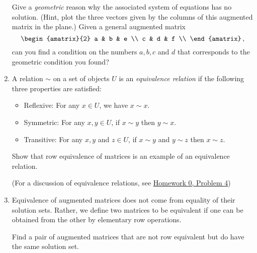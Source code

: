 \begin{enumerate}
Give a \emph{geometric} reason why the associated system of equations has no solution. (Hint, plot the three vectors
given by the columns of this augmented matrix in the plane.) Given a general augmented matrix $$
\begin{amatrix}{2} 
a & b & e  \\ 
c & d & f  \\ 
\end{amatrix}\, ,$$ can you find a condition on the numbers $a,b,c$ and $d$ that corresponds to  the geometric condition you found?


\item \label{ge5} 
A relation $\sim$ on a set of objects $U$ is an \emph{equivalence relation} if the following three properties are satisfied:
\begin{itemize}
\item Reflexive:  For any $x\in U$, we have $x\sim x$.
\item Symmetric:  For any $x,y \in U$, if $x\sim y$ then $y\sim x$.
\item Transitive: For any $x,y$ and $z \in U$, if $x\sim y$ and $y\sim z$ then $x\sim z$.
\end{itemize}
Show that row equivalence of matrices is an example of an {equivalence relation}.  

(For a  discussion of equivalence relations, see \href{\webworkurl Homework0-Background/4/}{Homework 0, Problem 4})



\item Equivalence of augmented matrices does not come from equality of their solution sets. Rather, we define two matrices to be equivalent if one can be obtained from the other by elementary row operations. 

Find a pair of augmented matrices that are not row equivalent but do have the same solution set.

\end{enumerate}




